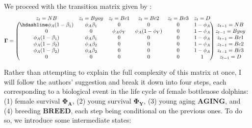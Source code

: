 \documentclass[
  12pt,
]{krantz}
\begin{document}
We proceed with the transition matrix given by \citet{couet2019}:
\[
\begin{matrix}
& \\
\mathbf{\Gamma} =
\left ( \vphantom{ \begin{matrix} 12 \\ 12 \\ 12 \\ 12 \\ 12 \\ 12 \end{matrix} } \right .
\end{matrix}
\hspace{-1.2em}
\begin{matrix}
z_t=NB & z_t = Byoy & z_t = Bc1 & z_t = Bc2 & z_t = Bc3 & z_t = D \\ \hdashline
\phi_A (1 - \beta_1) & \phi_A \beta_1 & 0 & 0 & 0 & 1 - \phi_A \\
0 & 0 & \phi_A \phi_Y & \phi_A (1-\phi_Y) & 0 & 1-\phi_A \\
\phi_A (1 - \beta_1) & \phi_A \beta_1 & 0 & 0 & 0 & 1-\phi_A \\
\phi_A (1 - \beta_2) & \phi_A \beta_2 & 0 & 0 & 0 & 1-\phi_A \\
\phi_A (1 - \beta_2) & \phi_A \beta_2 & 0 & 0 & 0 & 1-\phi_A \\
0 & 0 & 0 & 0 & 0 & 1
\end{matrix}
\hspace{-0.2em}
\begin{matrix}
& \\
\left . \vphantom{ \begin{matrix} 12 \\ 12 \\ 12 \\ 12 \\ 12 \\ 12 \end{matrix} } \right )
\begin{matrix}
z_{t-1} = NB \\
z_{t-1} = Byoy \\
z_{t-1} = Bc1 \\
z_{t-1} = Bc2 \\
z_{t-1} = Bc3 \\
z_{t-1} = D
\end{matrix}
\end{matrix}
\]

Rather than attempting to explain the full complexity of this matrix at once, I will follow the authors' suggestion and break it down into four steps, each corresponding to a biological event in the life cycle of female bottlenose dolphins: (1) female survival \(\mathbf{\Phi_A}\), (2) young survival \(\mathbf{\Phi_Y}\), (3) young aging \(\mathbf{AGING}\), and (4) breeding \(\mathbf{BREED}\), each step being conditional on the previous ones. To do so, we introduce some intermediate states:
\end{document}
